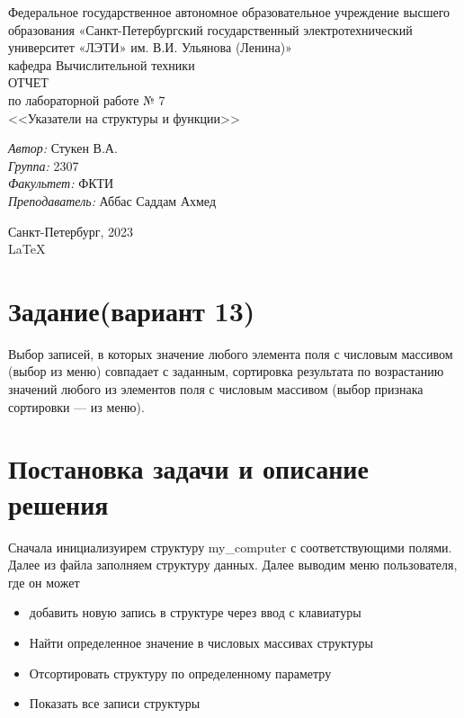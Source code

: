 \documentclass[a4paper,12pt]{report}
\begin{document}
 

\begin{titlepage} 

\begin{center} 

\large Федеральное государственное автономное образовательное учреждение высшего образования «Санкт-Петербургский государственный электротехнический университет «ЛЭТИ» им. В.И. Ульянова (Ленина)»\\
кафедра Вычислительной техники\\[5cm] 

\huge ОТЧЕТ\\ по лабораторной работе № 7\\[0.5cm] 
\large <<Указатели на структуры и функции>>\\[3.7cm]

\begin{minipage}{1\textwidth}
    \begin{flushleft}
        \emph{Автор:} Стукен В.А.\\
        \emph{Группа:} 2307\\
        \emph{Факультет:} ФКТИ\\
        \emph{Преподаватель:} Аббас Саддам Ахмед\\
    \end{flushleft}
\end{minipage}

\vfill

Санкт-Петербург, 2023\\
{\large \LaTeX}

\end{center}
\thispagestyle{empty}
\end{titlepage}

\section*{Задание(вариант 13)}
Выбор записей, в которых значение любого элемента поля с числовым массивом (выбор из меню) совпадает с заданным, сортировка результата по возрастанию значений любого из элементов поля с числовым массивом (выбор признака сортировки — из меню).

\section*{Постановка задачи и описание решения}
\par

Сначала инициализуирем структуру my_computer с соответствующими полями. Далее из файла заполняем структуру данных.
Далее выводим меню пользователя, где он может 
\begin{itemize}
    \item добавить новую запись в структуре через ввод с клавиатуры
    \item Найти определенное значение в числовых массивах структуры
    \item Отсортировать структуру по определенному параметру
    \item Показать все записи структуры
\end{itemize}
\end{document}

